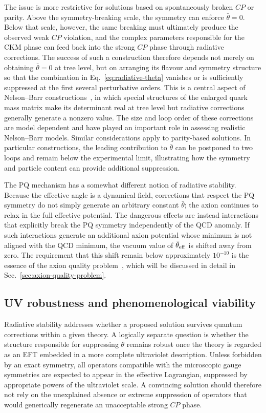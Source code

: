 \documentclass[review]{elsarticle}
\numberwithin{equation}{section}
\numberwithin{table}{section}
\numberwithin{figure}{section}
\begin{document}
The issue is more restrictive for solutions based on spontaneously broken $CP$ or parity. Above the symmetry-breaking scale, the symmetry can enforce $\bar\theta=0$. Below that scale, however, the same breaking must ultimately produce the observed weak $CP$ violation, and the complex parameters responsible for the CKM phase can feed back into the strong $CP$ phase through radiative corrections. The success of such a construction therefore depends not merely on obtaining $\bar\theta=0$ at tree level, but on arranging its flavour and symmetry structure so that the combination in Eq.~\eqref{eq:radiative-theta} vanishes or is sufficiently suppressed at the first several perturbative orders. This is a central aspect of Nelson--Barr constructions~\cite{Nelson:1983zb,Barr:1984qx}, in which special structures of the enlarged quark mass matrix make its determinant real at tree level but radiative corrections generally generate a nonzero value. The size and loop order of these corrections are model dependent and have played an important role in assessing realistic Nelson--Barr models. Similar considerations apply to parity-based solutions. In particular constructions, the leading contribution to $\bar\theta$ can be postponed to two loops and remain below the experimental limit, illustrating how the symmetry and particle content can provide additional suppression.

The PQ mechanism has a somewhat different notion of radiative stability. Because the effective angle is a dynamical field, corrections that respect the PQ symmetry do not simply generate an arbitrary constant $\bar\theta$; the axion continues to relax in the full effective potential. The dangerous effects are instead interactions that explicitly break the PQ symmetry independently of the QCD anomaly. If such interactions generate an additional axion potential whose minimum is not aligned with the QCD minimum, the vacuum value of $\bar\theta_{\rm eff}$ is shifted away from zero. The requirement that this shift remain below approximately $10^{-10}$ is the essence of the axion quality problem~\cite{DiLuzio:2020wdo}, which will be discussed in detail in Sec.~\ref{sec:axion-quality-problem}.

\subsection{UV robustness and phenomenological viability}
\label{sec:UV-robustness-viability}

Radiative stability addresses whether a proposed solution survives quantum corrections within a given theory. A logically separate question is whether the structure responsible for suppressing $\bar\theta$ remains robust once the theory is regarded as an EFT embedded in a more complete ultraviolet description. Unless forbidden by an exact symmetry, all operators compatible with the microscopic gauge symmetries are expected to appear in the effective Lagrangian, suppressed by appropriate powers of the ultraviolet scale. A convincing solution should therefore not rely on the unexplained absence or extreme suppression of operators that would generically regenerate an unacceptable strong $CP$ phase.
\end{document}

